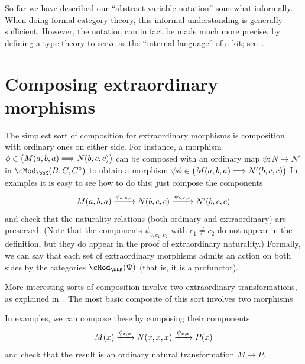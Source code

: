 \documentclass{amsart}
\newcommand{\A}{\cA}
\newcommand{\K}{\bbK}
\let\mod\cMod
\def\modk{\mod_\K}
\renewcommand{\o}{^{\circ}}
\let\vdash\Longrightarrow
\let\mto\vdash    %
\def\mtoo#1{\xRightarrow[#1]{}}
\def\mhom#1#2{\left( #1 \vphantom{\big|}\mto #2 \right)}
\begin{document}
So far we have described our ``abstract variable notation'' somewhat informally.
When doing formal category theory, this informal understanding is generally sufficient.
However, the notation can in fact be made much more precise, by defining a type theory to serve as the ``internal language'' of a kit; see~\cite{lnss:dirtt}.

\section{Composing extraordinary morphisms}
\label{sec:composing}

The simplest sort of composition for extraordinary morphisms is composition with ordinary ones on either side.
For instance, a morphism $\phi\in \mhom{M(a,b,a)}{N(b,c,c)}$ can be composed with an ordinary map $\psi:N\to N'$ in $\modk(B,C,C\o)$ to obtain a morphism $\psi\phi\in \mhom{M(a,b,a)}{N'(b,c,c)}$
In examples it is easy to see how to do this: just compose the components
\[ M(a,b,a) \xrightarrow{\phi_{a,b,c}} N(b,c,c) \xrightarrow{\psi_{b,c,c}} N'(b,c,c) \]
and check that the naturality relations (both ordinary and extraordinary) are preserved.
(Note that the components $\psi_{b,c_1,c_2}$ with $c_1\neq c_2$ do not appear in the definition, but they do appear in the proof of extraordinary naturality.)
Formally, we can say that each set of extraordinary morphisms admits an action on both sides by the categories $\modk(\Psi)$ (that is, it is a profunctor).

More interesting sorts of composition involve two extraordinary transformations, as explained in~\cite{ek:gen-funct-calc}.
The most basic composite of this sort involves two morphisms
In examples, we can compose these by composing their components
\[ M(x) \xrightarrow{\phi_{x,x}} N(x,x,x) \xrightarrow{\psi_{x,x}} P(x) \]
and check that the result is an ordinary natural transformation $M\to P$.
\end{document}
